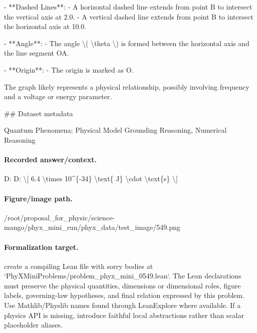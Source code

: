 - **Dashed Lines**:
  - A horizontal dashed line extends from point B to intersect the vertical axis at 2.0.
  - A vertical dashed line extends from point B to intersect the horizontal axis at 10.0.

- **Angle**:
  - The angle \textbackslash{}( \textbackslash{}theta \textbackslash{}) is formed between the horizontal axis and the line segment OA.

- **Origin**:
  - The origin is marked as O. 

The graph likely represents a physical relationship, possibly involving frequency and a voltage or energy parameter.

\#\# Dataset metadata

Quantum Phenomena; Physical Model Grounding Reasoning, Numerical Reasoning

\paragraph{Recorded answer/context.}
D: D: \textbackslash{}[ 6.4 \textbackslash{}times 10\textasciicircum{}\{-34\} \textbackslash{}text\{ J\} \textbackslash{}cdot \textbackslash{}text\{s\} \textbackslash{}]

\paragraph{Figure/image path.}
/root/proposal\_for\_physic/science-mango/phyx\_mini\_run/phyx\_data/test\_image/549.png

\paragraph{Formalization target.}
create a compiling Lean file with sorry bodies at `PhyXMiniProblems/problem\_phyx\_mini\_0549.lean`. The Lean declarations must preserve the physical quantities, dimensions or dimensional roles, figure labels, governing-law hypotheses, and final relation expressed by this problem.
Use Mathlib/Physlib names found through LeanExplore where available. If a physics API is missing, introduce faithful local abstractions rather than scalar placeholder aliases.

